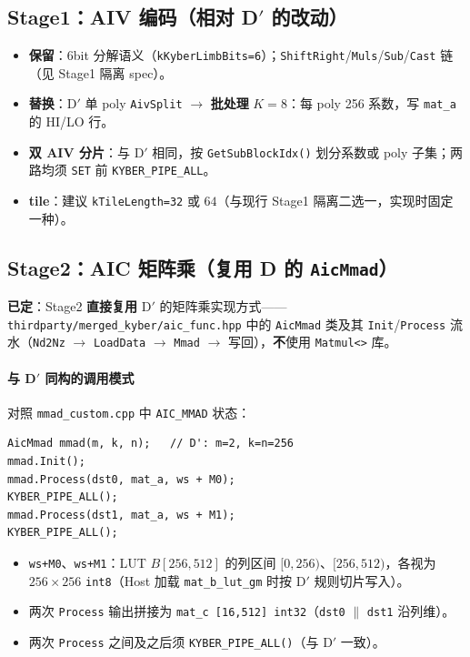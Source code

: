 \documentclass[UTF8,a4paper,11pt]{ctexart}
\begin{document}
\subsection{Stage1：AIV 编码（相对 D$'$ 的改动）}
\begin{itemize}
  \item \textbf{保留}：6bit 分解语义（\texttt{kKyberLimbBits=6}）；\texttt{ShiftRight}/\texttt{Muls}/\texttt{Sub}/\texttt{Cast} 链（见 Stage1 隔离 spec）。
  \item \textbf{替换}：D$'$ 单 poly \texttt{AivSplit} $\rightarrow$ \textbf{批处理} $K{=}8$：每 poly 256 系数，写 \texttt{mat\_a} 的 HI/LO 行。
  \item \textbf{双 AIV 分片}：与 D$'$ 相同，按 \texttt{GetSubBlockIdx()} 划分系数或 poly 子集；两路均须 \texttt{SET} 前 \texttt{KYBER\_PIPE\_ALL}。
  \item \textbf{tile}：建议 \texttt{kTileLength=32} 或 $64$（与现行 Stage1 隔离二选一，实现时固定一种）。
\end{itemize}

\subsection{Stage2：AIC 矩阵乘（复用 D 的 \texttt{AicMmad}）}
\label{sec:stage2}
\textbf{已定}：Stage2 \textbf{直接复用} D$'$ 的矩阵乘实现方式——\texttt{thirdparty/merged\_kyber/aic\_func.hpp} 中的 \texttt{AicMmad} 类及其 \texttt{Init}/\texttt{Process} 流水（\texttt{Nd2Nz} $\rightarrow$ \texttt{LoadData} $\rightarrow$ \texttt{Mmad} $\rightarrow$ 写回），\textbf{不}使用 \texttt{Matmul<>} 库。

\paragraph{与 D$'$ 同构的调用模式}
对照 \texttt{mmad\_custom.cpp} 中 \texttt{AIC\_MMAD} 状态：
\begin{verbatim}
AicMmad mmad(m, k, n);   // D': m=2, k=n=256
mmad.Init();
mmad.Process(dst0, mat_a, ws + M0);
KYBER_PIPE_ALL();
mmad.Process(dst1, mat_a, ws + M1);
KYBER_PIPE_ALL();
\end{verbatim}
\begin{itemize}
  \item \texttt{ws+M0}、\texttt{ws+M1}：LUT $B[256,512]$ 的列区间 $[0,256)$、$[256,512)$，各视为 $256\times 256$ \texttt{int8}（Host 加载 \texttt{mat\_b\_lut\_gm} 时按 D$'$ 规则切片写入）。
  \item 两次 \texttt{Process} 输出拼接为 \texttt{mat\_c [16,512] int32}（\texttt{dst0} $\parallel$ \texttt{dst1} 沿列维）。
  \item 两次 \texttt{Process} 之间及之后须 \texttt{KYBER_PIPE_ALL()}（与 D$'$ 一致）。
\end{itemize}
\end{document}
